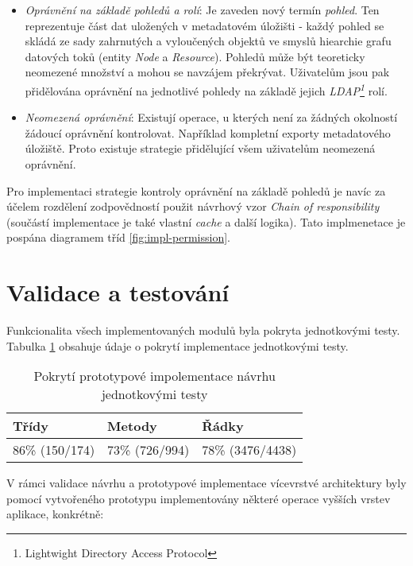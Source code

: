 \begin{itemize}
   \item{\textit{Oprávnění na základě pohledů a rolí}}: Je zaveden nový termín \textit{pohled}. Ten reprezentuje část dat uložených v metadatovém úložišti - každý pohled se skládá ze sady zahrnutých a vyloučených objektů ve smyslů hiearchie grafu datových toků (entity \textit{Node} a \textit{Resource}). Pohledů může být teoreticky neomezené množství a mohou se navzájem překrývat. Uživatelům jsou pak přidělována oprávnění na jednotlivé pohledy na základě jejich \textit{LDAP\footnote{Lightwight Directory Access Protocol}} rolí.

   \item{\textit{Neomezená oprávnění}}: Existují operace, u kterých není za žádných okolností žádoucí oprávnění kontrolovat. Například kompletní exporty metadatového úložiště. Proto existuje strategie přidělující všem uživatelům neomezená oprávnění.
\end{itemize}

Pro implementaci strategie kontroly oprávnění na základě pohledů je navíc za účelem rozdělení zodpovědností použit návrhový vzor \textit{Chain of responsibility} (součástí implementace je také vlastní \textit{cache} a další logika). Tato implmenetace je pospána diagramem tříd \ref{fig:impl-permission}.


\section{Validace a testování}
Funkcionalita všech implementovaných modulů byla pokryta jednotkovými testy. Tabulka \ref{tab:coverage} obsahuje údaje o pokrytí implementace jednotkovými testy.

\begin{table}[h!]
\begin{center}
\centering
\caption{Pokrytí prototypové impolementace návrhu jednotkovými testy}
\label{tab:coverage}
\begin{tabular}{|p{4cm}|p{4cm}|p{4cm}|}
	\hline
    Třídy & Metody & Řádky \\ \hline
	 86\% (150/174) &	73\% (726/994) &	78\% (3476/4438) \\ \hline
 \end{tabular}
 \end{center}
 \end{table}

V rámci validace návrhu a prototypové implementace vícevrstvé architektury byly pomocí vytvořeného prototypu implementovány některé operace vyšších vrstev aplikace, konkrétně:

